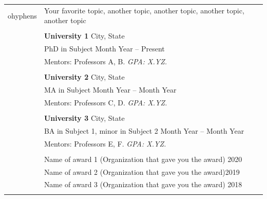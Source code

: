 \documentclass[letterpaper, 11pt]{article}
\begin{document}
\begin{longtable}{p{1.3in}p{4.8in}}



ohyphens{\color{OliveGreen}{Research interests}}
& Your favorite topic, another topic, another topic, another topic, another topic \\
& \\


\color{OliveGreen}{Education} 
& \textbf{University 1} \hfill City, State \\ 
& PhD in Subject \hfill Month Year -- Present \\
& Mentors: Professors A, B. {\it GPA: X.YZ.}\\
& \\

& \textbf{University 2} \hfill City, State \\
& MA in Subject \hfill Month Year -- Month Year\\
& Mentors: Professors C, D. {\it GPA: X.YZ.}\\
& \\

& \textbf{University 3} \hfill City, State\\
& BA in Subject 1, minor in Subject 2 \hfill Month Year -- Month Year \\
& Mentors: Professors E, F. {\it GPA: X.YZ.}\\
& \\



{\color{OliveGreen}{Honors and}} 
& Name of award 1 (Organization that gave you the award) \hfill 2020\\
{\color{OliveGreen}{scholarships}} 
& Name of award 2 (Organization that gave you the award)\hfill 2019 \\
& Name of award 3 (Organization that gave you the award) \hfill 2018 \\
& \\


\end{longtable}
\end{document}
